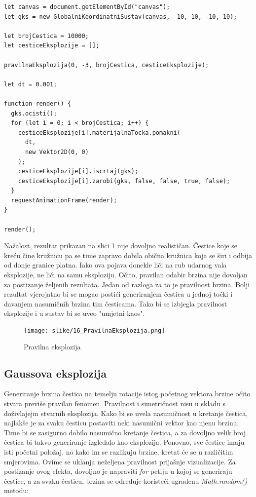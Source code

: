 \documentclass{foi}
\begin{document}
\begin{verbatim}    
let canvas = document.getElementById("canvas");
let gks = new GlobalniKoordinatniSustav(canvas, -10, 10, -10, 10);

let brojCestica = 10000;
let cesticeEksplozije = [];

pravilnaEksplozija(0, -3, brojCestica, cesticeEksplozije);

let dt = 0.001;

function render() {
  gks.ocisti();
  for (let i = 0; i < brojCestica; i++) {
    cesticeEksplozije[i].materijalnaTocka.pomakni(
      dt,
      new Vektor2D(0, 0)
    );
    cesticeEksplozije[i].iscrtaj(gks);
    cesticeEksplozije[i].zarobi(gks, false, false, true, false);
  }
  requestAnimationFrame(render);
}

render();
\end{verbatim}

Nažalost, rezultat prikazan na slici \ref{fig:PravilnaEksplozija} nije dovoljno realističan. Čestice koje se kreću čine kružnicu pa se time zapravo dobila obična kružnica koja se širi i odbija od donje granice platna. Iako ova pojava donekle liči na rub udarnog vala eksplozije, ne liči na samu eksploziju. Očito, pravilan odabir brzina nije dovoljan za postizanje željenih rezultata. Jedan od razloga za to je pravilnost brzina. Bolji rezultat vjerojatno bi se mogao postići generiranjem čestica u jednoj točki i davanjem nasumičnih brzina tim česticama. Tako bi se izbjegla pravilnost eksplozije i u sustav bi se uveo "umjetni kaos". 

\begin{figure}[H]
    \centering
    \texttt{[image: slike/16\_PravilnaEksplozija.png]}
    \captionsetup{justification=centering}
    \caption{Pravilna eksplozija}
\label{fig:PravilnaEksplozija}
\end{figure}


\subsection{Gaussova eksplozija}
Generiranje brzina čestica na temelju rotacije istog početnog vektora brzine očito stvara previše pravilan fenomen. Pravilnost i simetričnost nisu u skladu s doživlajejm stvarnih eksplozija. Kako bi se uvela nasumičnost u kretanje čestica, najlakše je za svaku česticu postaviti neki nasumični vektor kao njenu brzinu. Time bi se zasigurno dobilo nasumično kretanje čestica, a za dovoljno velik broj čestica bi takvo generiranje izgledalo kao eksplozija. Ponovno, sve čestice imaju isti početni položaj, no kako im se razlikuju brzine, kretat će se u različitim smjerovima. Ovime se uklanja neželjena pravilnost prijašnje vizualizacije. Za postizanje ovog efekta, dovoljno je napraviti \textit{for} petlju u kojoj se generiraju čestice, a za svaku česticu, brzina se određuje koristeći ugrađenu  \textit{Math.random()} metodu:
\end{document}
